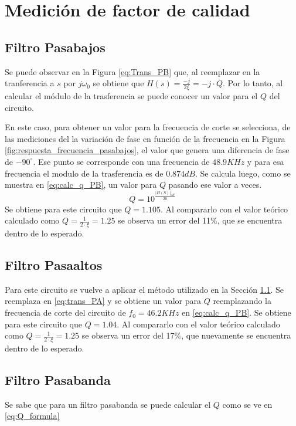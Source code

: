 
\section{Medici\'on de factor de calidad}
\subsection{Filtro Pasabajos}
\label{sec:FPB}
Se puede observar en la Figura \ref{eq:Trans_PB} que, al reemplazar en la tranferencia a $s$ por $j\omega _0$ se obtiene que $H(s) = \frac{-j}{2\xi} = -j\cdot Q $. Por lo tanto, al calcular el m\'odulo de la trasferencia se puede conocer un valor para el $Q$ del circuito.


En este caso, para obtener un valor para la frecuencia de corte se selecciona, de las mediciones del la variaci\'on de fase en funci\'on de la frecuencia en la Figura \ref{fig:respuesta_frecuencia_pasabajos}, el valor que genera una diferencia de fase de $-90^{\circ}$. Ese punto se corresponde con una frecuencia de $48.9KHz$ y para esa frecuencia el modulo de la trasferencia es de $0.874dB$. 
Se calcula luego, como se muestra en \ref{eq:calc_q_PB}, un valor para $Q$ pasando ese valor a veces.
\begin{equation}
    Q = 10^{\frac{|H(S)|_{dB}}{20}}
    \label{eq:calc_q_PB}
\end{equation}
Se obtiene para este circuito que $Q = 1.105$. Al compararlo con el valor te\'orico calculado como $Q = \frac{1}{2 \cdot \xi} = 1.25$ se observa un error del 11\%, que se encuentra dentro de lo esperado.

\subsection{Filtro Pasaaltos} 

Para este circuito se vuelve a aplicar el m\'etodo utilizado en la Secci\'on \ref{sec:FPB}.
Se reemplaza en \ref{eq:trans_PA} y se obtiene un valor para $Q$ reemplazando la frecuencia de corte del circuito de $f_0 = 46.2KHz$ en \ref{eq:calc_q_PB}.
Se obtiene para este circuito que $Q = 1.04$. Al compararlo con el valor te\'orico calculado como $Q = \frac{1}{2 \cdot \xi} = 1.25$ se observa un error del 17\%, que nuevamente se encuentra dentro de lo esperado.


\subsection{Filtro Pasabanda}
\label{sec:FPBa}
Se sabe que para un filtro pasabanda se puede calcular el $Q$ como se ve en \ref{eq:Q_formula}

